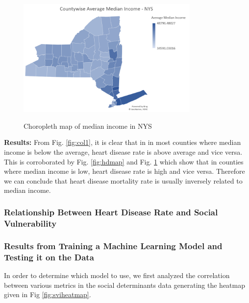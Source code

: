 \documentclass[journal,12pt,onecolumn]{IEEEtran}
\begin{document}
\begin{figure}[H]
\caption{Choropleth map of median income in NYS}
\centering
\includegraphics[width=0.8\textwidth]{figures/map_income.PNG}
\label{fig:mimap}
\end{figure}

\textbf{Results:}
From Fig. \ref{fig:col1}, it is clear that in in most counties where median income is below the average, heart disease rate is above average and vice versa.
This is corroborated by Fig. \ref{fig:hdmap} and Fig. \ref{fig:mimap} which show that in counties where median income is low, heart disease rate is high and vice versa.
Therefore we can conclude that heart disease mortality rate is usually inversely related to median income.   

\subsubsection{Relationship Between Heart Disease Rate and Social Vulnerability}

\subsubsection{Results from Training a Machine Learning Model and Testing it on the Data}
In order to determine which model to use, we first analyzed the correlation between various metrics in the social determinants data generating the heatmap given in Fig \ref{fig:sviheatmap}.
\end{document}
